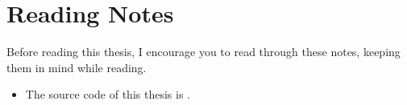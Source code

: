 \chapter{Reading Notes}
\label{chap:reading_notes}

Before reading this thesis, I encourage you to read through these notes, keeping
them in mind while reading.

\begin{itemize}

      \item The source code of this thesis is .

\end{itemize}
